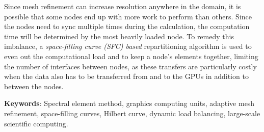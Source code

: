 Since mesh refinement can increase resolution anywhere in the domain, 
it is possible that some nodes end up with more work to perform than others. Since the nodes need to sync 
multiple times during the calculation, the computation time will be determined by the most heavily loaded
node. To remedy this imbalance, a \textit{space-filling curve (SFC) based} repartitioning algorithm is used
to even out the computational load and to keep a node's elements together, limiting the number of interfaces
between nodes, as these transfers are particularly costly when the data also has to be transferred from and 
to the GPUs in addition to between the nodes.



\textbf{Keywords}: Spectral element method, graphics computing units, adaptive mesh refinement, space-filling curves, Hilbert curve, dynamic load balancing, large-scale scientific computing.

 